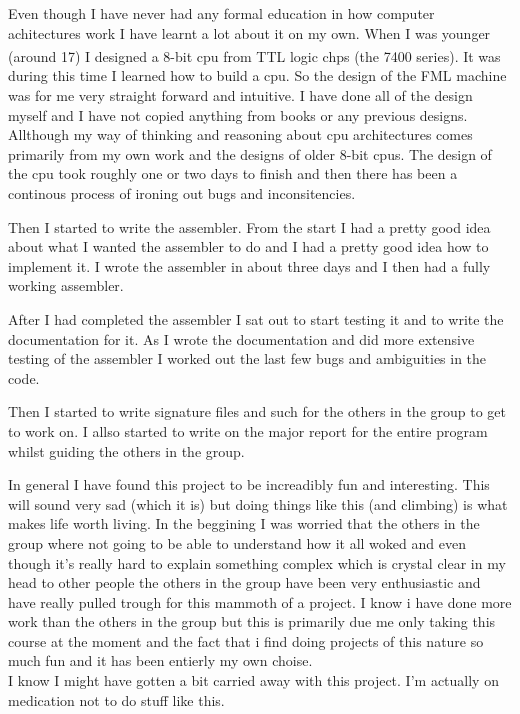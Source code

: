 \documentclass{article}
\begin{document}
Even though I have never had any formal education in how computer achitectures
work I have learnt a lot about it on my own. When I was younger (around 17) I
designed a 8-bit cpu from TTL logic chps (the 7400
series\textsuperscript{\cite{7400}}). It was during this time I learned how to
build a cpu. So the design of the FML machine was for me very straight forward
and intuitive.
I have done all of the design myself and I have not
copied anything from books or any previous designs. Allthough my way of thinking
and reasoning about cpu architectures comes primarily from my own work and the
designs of older 8-bit cpus. The design of the cpu took roughly one or two days
to finish and then there has been a continous process of ironing out bugs and
inconsitencies.

Then I started to write the assembler. From the start I had a pretty good idea
about what I wanted the assembler to do and I had a pretty good idea how to
implement it. I wrote the assembler in about three days and I then had a fully
working assembler.

After I had completed the assembler I sat out to start testing it and to write
the documentation for it. As I wrote the documentation and did more extensive
testing of the assembler I worked out the last few bugs and ambiguities in the
code.

Then I started to write signature files and such for the others in the group to
get to work on. I allso started to write on the major report for the entire
program whilst guiding the others in the group.

In general I have found this project to be increadibly fun and interesting.
This will sound very sad (which it is) but doing things like this (and climbing)
is what makes life worth living. In the beggining I was worried that the others
in the group where not going to be able to understand how it all woked and even 
though it's really hard to explain something complex which is crystal clear in 
my head to other people the others in
the group have been very enthusiastic and have really pulled trough for this
mammoth of a project. I know i have done more work than the others in the
group but this is primarily due me only taking this course at the moment and
the fact that i find doing projects of this nature so much fun and it has been entierly my own choise.
\\
I know I might have gotten a bit carried away with this project. I'm actually on
medication not to do stuff like this.
\end{document}
